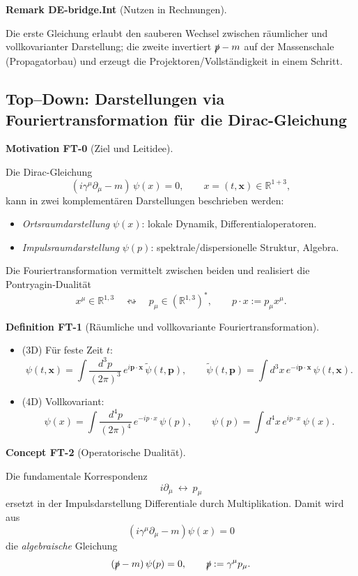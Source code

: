 \documentclass[10pt, letterpaper]{article}
\newcommand{\R}{\mathbb{R}}
\newcommand{\CustomHeading}[3]{%
  \par\medskip\noindent%
  \textbf{#1 #2} \textnormal{(#3)}.\enskip%
}
\newenvironment{DEF}[2]{\begin{unitbox}\CustomHeading{Definition}{#1}{#2}}{\end{unitbox}}
\newenvironment{REM}[2]{\begin{unitbox}\CustomHeading{Remark}{#1}{#2}}{\end{unitbox}}
\newenvironment{CONC}[2]{\begin{unitbox}\CustomHeading{Concept}{#1}{#2}}{\end{unitbox}}
\newenvironment{MOT}[2]{\begin{unitbox}\CustomHeading{Motivation}{#1}{#2}}{\end{unitbox}}
\begin{document}
\begin{REM}{DE-bridge.Int}{Nutzen in Rechnungen}
Die erste Gleichung erlaubt den sauberen Wechsel zwischen räumlicher und vollkovarianter Darstellung; die zweite invertiert $\slashed p-m$ auf der Massenschale (Propagatorbau) und erzeugt die Projektoren/Vollständigkeit in einem Schritt.
\end{REM}





\subsection{Top--Down: Darstellungen via Fouriertransformation für die Dirac-Gleichung}

\begin{MOT}{FT-0}{Ziel und Leitidee}
Die Dirac-Gleichung
\[
 (i\gamma^\mu\partial_\mu - m)\,\psi(x)=0,\qquad x=(t,\mathbf x)\in\R^{1+3},
\]
kann in zwei komplementären Darstellungen beschrieben werden:
\begin{itemize}
\item \emph{Ortsraumdarstellung} $\psi(x)$: lokale Dynamik, Differentialoperatoren.
\item \emph{Impulsraumdarstellung} $\psi(p)$: spektrale/dispersionelle Struktur, Algebra.
\end{itemize}
Die Fouriertransformation vermittelt zwischen beiden und realisiert die Pontryagin-Dualität
\[
x^\mu\in\R^{1,3} \quad\leftrightsquigarrow\quad p_\mu\in(\R^{1,3})^*,\qquad p\cdot x:=p_\mu x^\mu.
\]
\end{MOT}

\begin{DEF}{FT-1}{Räumliche und vollkovariante Fouriertransformation}
\begin{itemize}
\item (3D) Für feste Zeit $t$:
\[
 \psi(t,\mathbf x) = \int\!\frac{d^3p}{(2\pi)^3}\,e^{i\mathbf p\cdot\mathbf x}\,\tilde\psi(t,\mathbf p),
 \qquad
 \tilde\psi(t,\mathbf p)=\int d^3x\,e^{-i\mathbf p\cdot\mathbf x}\,\psi(t,\mathbf x).
\]
\item (4D) Vollkovariant:
\[
 \psi(x)=\int\!\frac{d^4p}{(2\pi)^4}\,e^{-ip\cdot x}\,\psi(p),
 \qquad
 \psi(p)=\int d^4x\,e^{ip\cdot x}\,\psi(x).
\]
\end{itemize}
\end{DEF}

\begin{CONC}{FT-2}{Operatorische Dualität}
Die fundamentale Korrespondenz
\[
 i\partial_\mu \ \longleftrightarrow\ p_\mu
\]
ersetzt in der Impulsdarstellung Differentiale durch Multiplikation. Damit wird aus
\[
 (i\gamma^\mu\partial_\mu-m)\psi(x)=0
\]
die \emph{algebraische} Gleichung
\[
 (\slashed p - m)\,\psi(p)=0,\qquad \slashed p:=\gamma^\mu p_\mu.
\]
\end{CONC}
\end{document}
